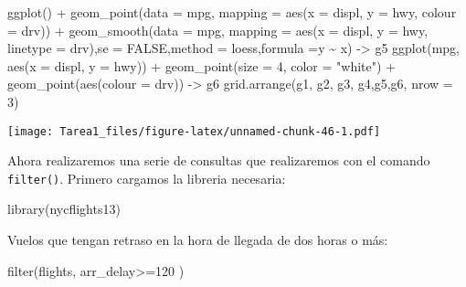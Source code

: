 \documentclass[
]{article}
\newenvironment{Shaded}{\begin{snugshade}}{\end{snugshade}}
\newcommand{\AttributeTok}[1]{\textcolor[rgb]{0.77,0.63,0.00}{#1}}
\newcommand{\ConstantTok}[1]{\textcolor[rgb]{0.00,0.00,0.00}{#1}}
\newcommand{\DecValTok}[1]{\textcolor[rgb]{0.00,0.00,0.81}{#1}}
\newcommand{\FunctionTok}[1]{\textcolor[rgb]{0.00,0.00,0.00}{#1}}
\newcommand{\NormalTok}[1]{#1}
\newcommand{\OtherTok}[1]{\textcolor[rgb]{0.56,0.35,0.01}{#1}}
\newcommand{\SpecialCharTok}[1]{\textcolor[rgb]{0.00,0.00,0.00}{#1}}
\newcommand{\StringTok}[1]{\textcolor[rgb]{0.31,0.60,0.02}{#1}}
\begin{document}
\begin{Shaded}
\begin{Highlighting}[]
\FunctionTok{ggplot}\NormalTok{() }\SpecialCharTok{+}
  \FunctionTok{geom\_point}\NormalTok{(}\AttributeTok{data =}\NormalTok{ mpg, }\AttributeTok{mapping =} \FunctionTok{aes}\NormalTok{(}\AttributeTok{x =}\NormalTok{ displ, }\AttributeTok{y =}\NormalTok{ hwy, }\AttributeTok{colour =}\NormalTok{ drv)) }\SpecialCharTok{+}
  \FunctionTok{geom\_smooth}\NormalTok{(}\AttributeTok{data =}\NormalTok{ mpg, }\AttributeTok{mapping =} \FunctionTok{aes}\NormalTok{(}\AttributeTok{x =}\NormalTok{ displ, }\AttributeTok{y =}\NormalTok{ hwy, }\AttributeTok{linetype =}\NormalTok{ drv),}\AttributeTok{se =} \ConstantTok{FALSE}\NormalTok{,}\AttributeTok{method =} \StringTok{\textquotesingle{}loess\textquotesingle{}}\NormalTok{,}\AttributeTok{formula =}\NormalTok{y }\SpecialCharTok{\textasciitilde{}}\NormalTok{ x) }\OtherTok{{-}\textgreater{}}\NormalTok{ g5}
\FunctionTok{ggplot}\NormalTok{(mpg, }\FunctionTok{aes}\NormalTok{(}\AttributeTok{x =}\NormalTok{ displ, }\AttributeTok{y =}\NormalTok{ hwy)) }\SpecialCharTok{+}
  \FunctionTok{geom\_point}\NormalTok{(}\AttributeTok{size =} \DecValTok{4}\NormalTok{, }\AttributeTok{color =} \StringTok{"white"}\NormalTok{) }\SpecialCharTok{+}
  \FunctionTok{geom\_point}\NormalTok{(}\FunctionTok{aes}\NormalTok{(}\AttributeTok{colour =}\NormalTok{ drv)) }\OtherTok{{-}\textgreater{}}\NormalTok{ g6}
\FunctionTok{grid.arrange}\NormalTok{(g1, g2, g3, g4,g5,g6, }\AttributeTok{nrow =} \DecValTok{3}\NormalTok{)}
\end{Highlighting}
\end{Shaded}

\texttt{[image: Tarea1\_files/figure-latex/unnamed-chunk-46-1.pdf]}

Ahora realizaremos una serie de consultas que realizaremos con el
comando \texttt{filter()}. Primero cargamos la libreria necesaria:

\begin{Shaded}
\begin{Highlighting}[]
\FunctionTok{library}\NormalTok{(nycflights13)}
\end{Highlighting}
\end{Shaded}

Vuelos que tengan retraso en la hora de llegada de dos horas o más:

\begin{Shaded}
\begin{Highlighting}[]
\FunctionTok{filter}\NormalTok{(flights, arr\_delay}\SpecialCharTok{\textgreater{}=}\DecValTok{120}\NormalTok{ )}
\end{Highlighting}
\end{Shaded}
\end{document}
